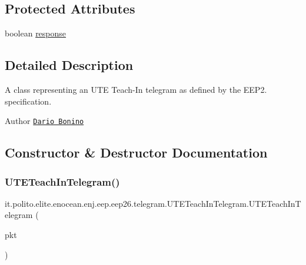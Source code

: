 \subsection*{Protected Attributes}
\begin{DoxyCompactItemize}
\item 
boolean \hyperlink{classit_1_1polito_1_1elite_1_1enocean_1_1enj_1_1eep_1_1eep26_1_1telegram_1_1_u_t_e_teach_in_telegram_a0cc5ba036863e135e7cfa2d94ab6facf}{response}
\end{DoxyCompactItemize}


\subsection{Detailed Description}
A class representing an U\+TE Teach-\/\+In telegram as defined by the E\+E\+P2. specification.

\begin{DoxyAuthor}{Author}
\href{mailto:dario.bonino@gmail.com}{\tt Dario Bonino} 
\end{DoxyAuthor}


\subsection{Constructor \& Destructor Documentation}
\hypertarget{classit_1_1polito_1_1elite_1_1enocean_1_1enj_1_1eep_1_1eep26_1_1telegram_1_1_u_t_e_teach_in_telegram_a7f6dc7f2ae73f102f4f12a1c27856390}{}\label{classit_1_1polito_1_1elite_1_1enocean_1_1enj_1_1eep_1_1eep26_1_1telegram_1_1_u_t_e_teach_in_telegram_a7f6dc7f2ae73f102f4f12a1c27856390} 
\subsubsection{\texorpdfstring{U\+T\+E\+Teach\+In\+Telegram()}{UTETeachInTelegram()}}
{\footnotesize\ttfamily it.\+polito.\+elite.\+enocean.\+enj.\+eep.\+eep26.\+telegram.\+U\+T\+E\+Teach\+In\+Telegram.\+U\+T\+E\+Teach\+In\+Telegram (\begin{DoxyParamCaption}\item[{\hyperlink{classit_1_1polito_1_1elite_1_1enocean_1_1protocol_1_1serial_1_1v3_1_1network_1_1packet_1_1_e_s_p3_packet}{E\+S\+P3\+Packet}}]{pkt }\end{DoxyParamCaption})}

